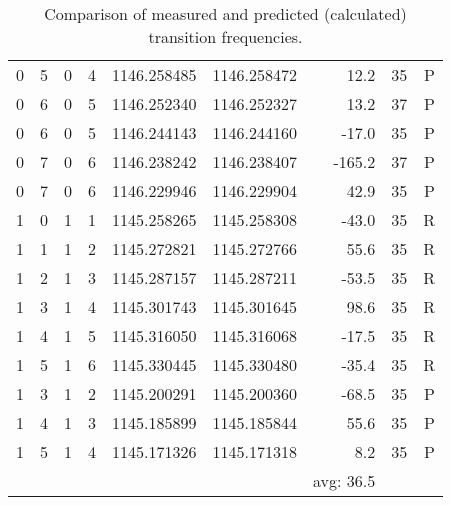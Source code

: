 \begin{table}
\begin{tabu}{rrrrrrrrr}
\rowfont{\color{blue}}0 & 5 & 0 & 4 & 1146.258485 & 1146.258472 & 12.2 & 35 & P\\
\rowfont{\color{blue}}0 & 6 & 0 & 5 & 1146.252340 & 1146.252327 & 13.2 & 37 & P\\
\rowfont{\color{blue}}0 & 6 & 0 & 5 & 1146.244143 & 1146.244160 & -17.0 & 35 & P\\
\rowfont{\color{blue}}0 & 7 & 0 & 6 & 1146.238242 & 1146.238407 & -165.2 & 37 & P\\
\rowfont{\color{blue}}0 & 7 & 0 & 6 & 1146.229946 & 1146.229904 & 42.9 & 35 & P\\
\rowfont{\color{red}}1 & 0 & 1 & 1 & 1145.258265 & 1145.258308 & -43.0 & 35 & R\\
\rowfont{\color{red}}1 & 1 & 1 & 2 & 1145.272821 & 1145.272766 & 55.6 & 35 & R\\
\rowfont{\color{red}}1 & 2 & 1 & 3 & 1145.287157 & 1145.287211 & -53.5 & 35 & R\\
\rowfont{\color{red}}1 & 3 & 1 & 4 & 1145.301743 & 1145.301645 & 98.6 & 35 & R\\
\rowfont{\color{red}}1 & 4 & 1 & 5 & 1145.316050 & 1145.316068 & -17.5 & 35 & R\\
\rowfont{\color{red}}1 & 5 & 1 & 6 & 1145.330445 & 1145.330480 & -35.4 & 35 & R\\
\rowfont{\color{blue}}1 & 3 & 1 & 2 & 1145.200291 & 1145.200360 & -68.5 & 35 & P\\
\rowfont{\color{blue}}1 & 4 & 1 & 3 & 1145.185899 & 1145.185844 & 55.6 & 35 & P\\
\rowfont{\color{blue}}1 & 5 & 1 & 4 & 1145.171326 & 1145.171318 & 8.2 & 35 & P\\
\midrule
 &  &  &  &  &  &  avg: 36.5\\
\bottomrule
\end{tabu}\caption{Comparison of measured and predicted (calculated) transition frequencies.}\end{table}

